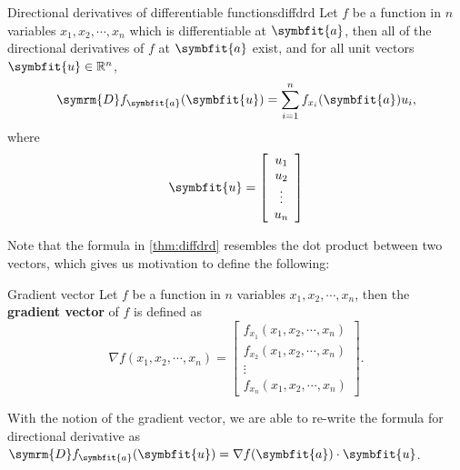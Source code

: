 \documentclass[math]{amznotes}
\theoremstyle{remark}
\begin{document}
\begin{thmbox}{Directional derivatives of differentiable functions}{diffdrd}
    Let $f$ be a function in $n$ variables $x_1, x_2, \cdots, x_n$ which is differentiable at $\symbfit{a}$, then all of the directional derivatives of $f$ at $\symbfit{a}$ exist, and for all unit vectors $\symbfit{u} \in \R^n$,
    \begin{equation*}
        \symrm{D}f_{\symbfit{a}}(\symbfit{u}) = \sum_{i = 1}^{n}f_{x_i}(\symbfit{a})u_i,
    \end{equation*}
    where
    \begin{equation*}
        \symbfit{u} = \left[\begin{array}{c}
                u_1    \\
                u_2    \\
                \vdots \\
                u_n
            \end{array}\right]
    \end{equation*}
\end{thmbox}
Note that the formula in \ref{thm:diffdrd} resembles the dot product between two vectors, which gives us motivation to define the following:
\begin{dfnbox}{Gradient vector}
    Let $f$ be a function in $n$ variables $x_1, x_2, \cdots, x_n$, then the {\color{red} \textbf{gradient vector}} of $f$ is defined as
    \begin{equation*}
        \nabla f(x_1, x_2, \cdots, x_n) =  \left[\begin{array}{c}
                f_{x_1}(x_1, x_2, \cdots, x_n) \\
                f_{x_2}(x_1, x_2, \cdots, x_n) \\
                \vdots                         \\
                f_{x_n}(x_1, x_2, \cdots, x_n)
            \end{array}\right].
    \end{equation*}
\end{dfnbox}
With the notion of the gradient vector, we are able to re-write the formula for directional derivative as $\symrm{D}f_{\symbfit{a}}(\symbfit{u}) = \nabla f(\symbfit{a}) \cdot \symbfit{u}$.
\end{document}
